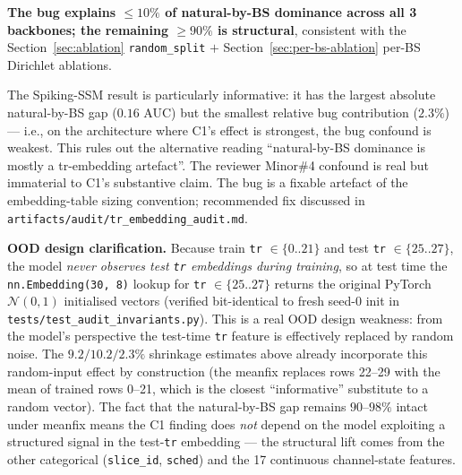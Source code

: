 \documentclass[journal]{IEEEtran}
\begin{document}
\textbf{The bug explains $\leq 10\%$ of natural-by-BS dominance across all 3 backbones; the remaining $\geq 90\%$ is structural}, consistent with the Section~\ref{sec:ablation} \lstinline|random_split| $+$ Section~\ref{sec:per-bs-ablation} per-BS Dirichlet ablations.

The Spiking-SSM result is particularly informative: it has the largest absolute natural-by-BS gap ($0.16$ AUC) but the smallest relative bug contribution ($2.3\%$) --- i.e., on the architecture where C1's effect is strongest, the bug confound is weakest. This rules out the alternative reading ``natural-by-BS dominance is mostly a tr-embedding artefact''. The reviewer Minor\#4 confound is real but immaterial to C1's substantive claim. The bug is a fixable artefact of the embedding-table sizing convention; recommended fix discussed in \lstinline|artifacts/audit/tr_embedding_audit.md|.

\textbf{OOD design clarification.} Because train \lstinline|tr| $\in \{0..21\}$ and test \lstinline|tr| $\in \{25..27\}$, the model \emph{never observes test \lstinline|tr| embeddings during training}, so at test time the \lstinline|nn.Embedding(30, 8)| lookup for \lstinline|tr| $\in \{25..27\}$ returns the original PyTorch $\mathcal{N}(0, 1)$ initialised vectors (verified bit-identical to fresh seed-0 init in \lstinline|tests/test_audit_invariants.py|). This is a real OOD design weakness: from the model's perspective the test-time \lstinline|tr| feature is effectively replaced by random noise. The $9.2 / 10.2 / 2.3\%$ shrinkage estimates above already incorporate this random-input effect by construction (the meanfix replaces rows 22--29 with the mean of trained rows 0--21, which is the closest ``informative'' substitute to a random vector). The fact that the natural-by-BS gap remains $90$--$98\%$ intact under meanfix means the C1 finding does \emph{not} depend on the model exploiting a structured signal in the test-\lstinline|tr| embedding --- the structural lift comes from the other categorical (\lstinline|slice_id|, \lstinline|sched|) and the 17 continuous channel-state features.
\end{document}
